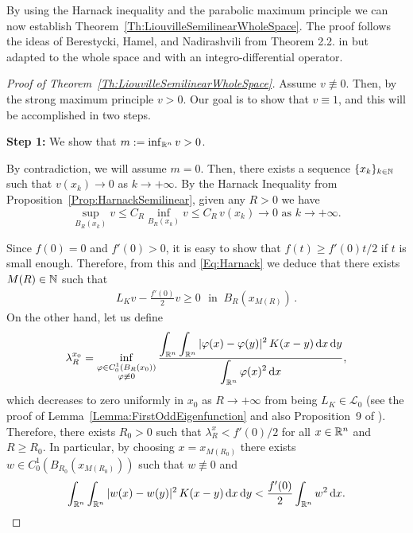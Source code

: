 

By using the Harnack inequality and the parabolic maximum principle we can now establish Theorem~\ref{Th:LiouvilleSemilinearWholeSpace}. The proof follows the ideas of Berestycki, Hamel, and Nadirashvili from Theorem 2.2. in \cite{BerestyckiHamelNadi} but adapted to the whole space and with an integro-differential operator.

\begin{proof}[Proof of Theorem~\ref{Th:LiouvilleSemilinearWholeSpace}]


Assume $v\not\equiv 0$. Then, by the strong maximum principle $v>0$. Our goal is to show that $v\equiv 1$, and this will be accomplished in two steps.

\textbf{Step 1:} We show that $m:=\inf_{\mathbb{R}^n} v >0$.

By contradiction, we will assume $m=0$. Then, there exists a sequence $\{x_k\}_{k\in\mathbb{N}}$ such that
$v(x_k)\rightarrow 0$ as $k \rightarrow +\infty$. By the Harnack Inequality from Proposition~\ref{Prop:HarnackSemilinear}, given any $R>0$ we have 
\begin{equation}
\label{Eq:Harnack}
\sup_{B_R(x_k)}v \leq C_R \inf_{B_R(x_k)}v \leq C_R \, v(x_k) \rightarrow 0 \,\,\text{as}\,\, k\rightarrow +\infty.
\end{equation}


Since $f(0) = 0 $ and $f'(0)>0$, it is easy to show that $f(t)\geq f'(0)t/2$ if $t$ is small enough. Therefore, from this and \eqref{Eq:Harnack}  we deduce that there exists $M(R)\in\mathbb{N}$ such that
\begin{align}
\label{Eq:WholeSpace2}
L_K  v - \frac{f'(0)}{2}v \geq 0 \,\,\textrm{ in }\ B_R(x_{M(R)})\,.
\end{align}
On the other hand, let us define
$$  \lambda_R^{x_0} = \inf_{\substack{\varphi\in C^1_0(B_R(x_0))\\ \varphi\not\equiv 0}} \frac{\displaystyle \int_{\mathbb{R}^n}\int_{\mathbb{R}^n}|\varphi(x)-\varphi(y)|^2\,K(x-y) \,\mathrm{d} x \,\mathrm{d} y}{\displaystyle \int_{\mathbb{R}^n}\varphi(x)^2 \,\mathrm{d} x}, 
$$
which decreases to zero uniformly in $x_0$ as $R\to +\infty$ from being $L_K \in\mathcal{L}_0$ (see the proof of Lemma~\ref{Lemma:FirstOddEigenfunction} and also Proposition~9 of \cite{ServadeiValdinoci}). Therefore, there exists $R_0>0$ such that $ \lambda_R^x < f'(0)/2$ for all $x\in \mathbb{R}^n$ and $R\geq R_0$. In particular, by choosing $x=x_{M(R_0)}$ there exists $w\in C^1_0(B_{R_0}(x_{M(R_0)}))$ such that $w\not\equiv 0$ and
\begin{equation}
\label{Eq:Eigenfunction}
\int_{\mathbb{R}^n}\int_{\mathbb{R}^n}|w(x)-w(y)|^2\,K(x-y) \,\mathrm{d} x \,\mathrm{d} y < \frac{f'(0)}{2}\int_{\mathbb{R}^n}w^2 \,\mathrm{d} x.
\end{equation}


\end{proof}
